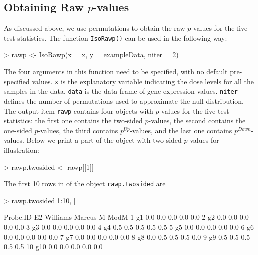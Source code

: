 \documentclass[10pt]{mybook4}
\begin{document}
\subsection{Obtaining Raw $p$-values}

As discussed above, we use permutations to obtain the raw $p$-values
for the five test statistics. The function \texttt{IsoRawp()} can be
used in the following way:

\begin{Schunk}
\begin{Sinput}
> rawp <- IsoRawp(x = x, y = exampleData, niter = 2)
\end{Sinput}
\end{Schunk}


The four arguments in this function need to be specified, with no
default pre-specified values. \texttt{x} is the explanatory variable
indicating the dose levels for all the samples in the data.
\texttt{data} is the data frame of gene expression values. %
\texttt{niter} defines the number of permutations used to
approximate the null distribution. The output item
\texttt{rawp} contains four objects with $p$-values for the five
test statistics: the first one contains the two-sided $p$-values,
the second contains the one-sided $p$-values, the third contains
$p^{Up}$-values, and the last one contains $p^{Down}$-values. Below
we print a part of the object with two-sided $p$-values for illustration:

\begin{Schunk}
\begin{Sinput}
> rawp.twosided <- rawp[[1]]
\end{Sinput}
\end{Schunk}


The first 10 rows in of the object \texttt{rawp.twosided} are
\begin{Schunk}
\begin{Sinput}
> rawp.twosided[1:10, ]
\end{Sinput}
\begin{Soutput}
   Probe.ID  E2 Williams Marcus   M ModM
1        g1 0.0      0.0    0.0 0.0  0.0
2        g2 0.0      0.0    0.0 0.0  0.0
3        g3 0.0      0.0    0.0 0.0  0.0
4        g4 0.5      0.5    0.5 0.5  0.5
5        g5 0.0      0.0    0.0 0.0  0.0
6        g6 0.0      0.0    0.0 0.0  0.0
7        g7 0.0      0.0    0.0 0.0  0.0
8        g8 0.0      0.5    0.5 0.5  0.0
9        g9 0.5      0.5    0.5 0.5  0.5
10      g10 0.0      0.0    0.0 0.0  0.0
\end{Soutput}
\end{Schunk}
\end{document}
